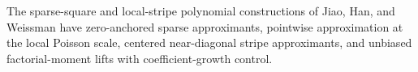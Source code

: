 The sparse-square and local-stripe polynomial constructions of Jiao, Han, and Weissman have zero-anchored sparse approximants, pointwise approximation at the local Poisson scale, centered near-diagonal stripe approximants, and unbiased factorial-moment lifts with coefficient-growth control.